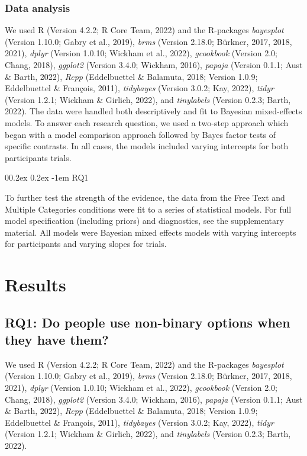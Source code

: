 \documentclass[
  man]{apa7}
\makeatletter
\let\oldparagraph\paragraph
\renewcommand{\paragraph}[1]{\oldparagraph{#1}\mbox{}}
\renewcommand{\paragraph}{\@startsection{paragraph}{4}{\parindent}%
  {0\baselineskip \@plus 0.2ex \@minus 0.2ex}%
  {-1em}%
  {\normalfont\normalsize\bfseries\itshape\typesectitle}}
\renewcommand{\paragraph}{\@startsection{paragraph}{4}{\parindent}%
  {0\baselineskip \@plus 0.2ex \@minus 0.2ex}%
  {-1em}%
  {\normalfont\normalsize\bfseries\typesectitle}}
\makeatother
\begin{document}
\hypertarget{data-analysis}{%
\subsubsection{Data analysis}\label{data-analysis}}

We used R (Version 4.2.2; R Core Team, 2022) and the R-packages \emph{bayesplot} (Version 1.10.0; Gabry et al., 2019), \emph{brms} (Version 2.18.0; Bürkner, 2017, 2018, 2021), \emph{dplyr} (Version 1.0.10; Wickham et al., 2022), \emph{gcookbook} (Version 2.0; Chang, 2018), \emph{ggplot2} (Version 3.4.0; Wickham, 2016), \emph{papaja} (Version 0.1.1; Aust \& Barth, 2022), \emph{Rcpp} (Eddelbuettel \& Balamuta, 2018; Version 1.0.9; Eddelbuettel \& François, 2011), \emph{tidybayes} (Version 3.0.2; Kay, 2022), \emph{tidyr} (Version 1.2.1; Wickham \& Girlich, 2022), and \emph{tinylabels} (Version 0.2.3; Barth, 2022). The data were handled both descriptively and fit to Bayesian mixed-effects models. To answer each research question, we used a two-step approach which began with a model comparison approach followed by Bayes factor tests of specific contrasts. In all cases, the models included varying intercepts for both participants trials.

\hypertarget{rq1}{%
\paragraph{RQ1}\label{rq1}}

To further test the strength of the evidence, the data from the Free Text and Multiple Categories conditions were fit to a series of statistical models. For full model specification (including priors) and diagnostics, see the supplementary material. All models were Bayesian mixed effects models with varying intercepts for participants and varying slopes for trials.

\hypertarget{results}{%
\section{Results}\label{results}}

\hypertarget{rq1-do-people-use-non-binary-options-when-they-have-them}{%
\subsection{RQ1: Do people use non-binary options when they have them?}\label{rq1-do-people-use-non-binary-options-when-they-have-them}}

We used R (Version 4.2.2; R Core Team, 2022) and the R-packages \emph{bayesplot} (Version 1.10.0; Gabry et al., 2019), \emph{brms} (Version 2.18.0; Bürkner, 2017, 2018, 2021), \emph{dplyr} (Version 1.0.10; Wickham et al., 2022), \emph{gcookbook} (Version 2.0; Chang, 2018), \emph{ggplot2} (Version 3.4.0; Wickham, 2016), \emph{papaja} (Version 0.1.1; Aust \& Barth, 2022), \emph{Rcpp} (Eddelbuettel \& Balamuta, 2018; Version 1.0.9; Eddelbuettel \& François, 2011), \emph{tidybayes} (Version 3.0.2; Kay, 2022), \emph{tidyr} (Version 1.2.1; Wickham \& Girlich, 2022), and \emph{tinylabels} (Version 0.2.3; Barth, 2022).
\end{document}
